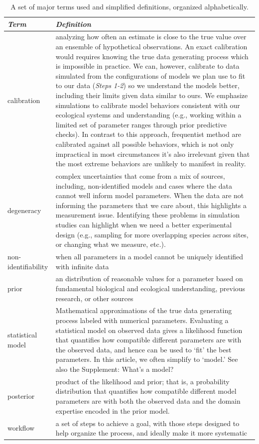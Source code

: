 \documentclass[11pt]{article}
\begin{document}
\begin{table}
\caption{A set of major terms used and simplified definitions, organized alphabetically.}
\begin{tabular}{ p{3 cm}  p{12 cm} }  \hline \hline
 \emph{Term}   & \emph{Definition}\\ 
\hline \hline
calibration & analyzing how often an estimate is close to the true value over an ensemble of hypothetical observations.  An exact calibration would requires knowing the true data generating process which is impossible in practice.  We can, however, calibrate to data simulated from the configurations of models we plan use to fit to our data (\emph{Steps 1-2}) so we understand the models better, including their limits given data similar to ours. We emphasize simulations to calibrate model behaviors consistent with our ecological systems and understanding (e.g., working within a limited set of parameter ranges through prior predictive checks). In contrast to this approach, frequentist method are calibrated against all possible behaviors, which is not only impractical in most circumstances it’s also irrelevant given that the most extreme behaviors are unlikely to manifest in reality. \\\hline
degeneracy & complex uncertainties that come from a mix of sources, including, non-identified models and cases where the data cannot well inform model parameters. When the data are not informing the parameters that we care about, this highlights a measurement issue. Identifying these problems in simulation studies can highlight when we need a better experimental design (e.g., sampling for more overlapping species across sites, or changing what we measure, etc.).  \\\hline
non-identifiability & when all parameters in a model cannot be uniquely identified with infinite data \\\hline
prior & an distribution of reasonable values for a parameter based on fundamental biological and ecological understanding, previous research, or other sources \\\hline
statistical model & Mathematical approximations of the true data generating process labeled with numerical parameters.  Evaluating a statistical model on observed data gives a likelihood function that quantifies how compatible different parameters are with the observed data, and hence can be used to `fit' the best parameters. In this article, we often simplify to `model.' See also the Supplement: What's a model? \\\hline
posterior & product of the likelihood and prior; that is, a probability distribution that quantifies how compatible different model parameters are with both the observed data and the domain expertise encoded in the prior model. \\\hline
workflow & a set of steps to achieve a goal, with those steps designed to help organize the process, and ideally make it more systematic  \\\hline
\hline
\end{tabular}
\label{tab:glossary}
\end{table}
\end{document}
